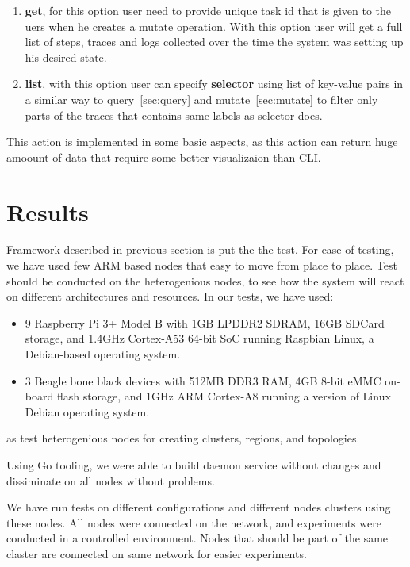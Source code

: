 \begin{enumerate}[start=1,label={(\bfseries \arabic*)}]
	\item \textbf{get}, for this option user need to provide unique task id that is given to the uers when he creates a mutate operation. With this option user will get a full list of steps, traces and logs collected over the time the system was setting up his desired state.  
	\item \textbf{list}, with this option user can specify \textbf{selector} using list of key-value pairs in a similar way to query~\ref{sec:query} and mutate~\ref{sec:mutate} to filter only parts of the traces that contains same labels as selector does.
\end{enumerate}

This action is implemented in some basic aspects, as this action can return huge amoount of data that require some better visualizaion than CLI.
%
%
\section{Results}\label{sec:results} 
Framework described in previous section is put the the test. For ease of testing, we have used few ARM based nodes that easy to move from place to place. Test should be conducted on the heterogenious nodes, to see how the system will react on different architectures and resources. In our tests, we have used:

\begin{itemize}
	\item 9 Raspberry Pi 3+ Model B with 1GB LPDDR2 SDRAM, 16GB SDCard storage, and 1.4GHz Cortex-A53 64-bit SoC running Raspbian Linux, a Debian-based operating system.
	\item 3 Beagle bone black devices with 512MB DDR3 RAM, 4GB 8-bit eMMC on-board flash storage, and 1GHz ARM Cortex-A8 running a version of Linux Debian operating system.
\end{itemize}

\noindent
as test heterogenious nodes for creating clusters, regions, and topologies. 

Using Go tooling, we were able to build daemon service without changes and dissiminate on all nodes without problems.

We have run tests on different configurations and different nodes clusters using these nodes. All nodes were connected on the network, and experiments were conducted in a controlled environment. Nodes that should be part of the same claster are connected on same network for easier experiments.

